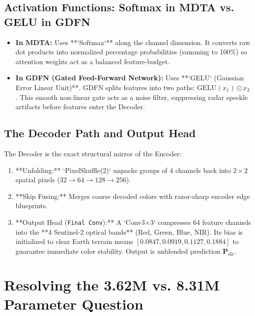 \documentclass[11pt,a4paper]{article}
\begin{document}
\subsection{Activation Functions: Softmax in MDTA vs. GELU in GDFN}
\begin{itemize}[leftmargin=1.5em]
    \item \textbf{In MDTA:} Uses **`Softmax`** along the channel dimension. It converts raw dot products into normalized percentage probabilities (summing to 100\%) so attention weights act as a balanced feature-budget.
    \item \textbf{In GDFN (Gated Feed-Forward Network):} Uses **`GELU` (Gaussian Error Linear Unit)**. GDFN splits features into two paths: $\text{GELU}(x_1) \odot x_2$. This smooth non-linear gate acts as a noise filter, suppressing radar speckle artifacts before features enter the Decoder.
\end{itemize}

\subsection{The Decoder Path and Output Head}
The Decoder is the exact structural mirror of the Encoder:
\begin{enumerate}[leftmargin=1.5em]
    \item **Unfolding:** `PixelShuffle(2)` unpacks groups of 4 channels back into $2\times 2$ spatial pixels ($32 \to 64 \to 128 \to 256$).
    \item **Skip Fusing:** Merges coarse decoded colors with razor-sharp encoder edge blueprints.
    \item **Output Head (\texttt{Final Conv}):** A `Conv3×3` compresses 64 feature channels into the **4 Sentinel-2 optical bands** (Red, Green, Blue, NIR). Its bias is initialized to clear Earth terrain means $[0.0847, 0.0919, 0.1127, 0.1884]$ to guarantee immediate color stability. Output is unblended prediction $\mathbf{P}_{\text{dir}}$.
\end{enumerate}

\section{Resolving the 3.62M vs. 8.31M Parameter Question}
\end{document}
